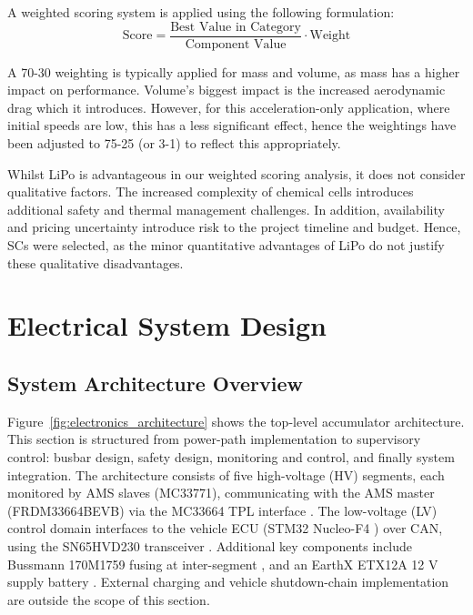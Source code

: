 A weighted scoring system is applied using the following formulation:
\begin{equation*}
\text{Score} = \frac{\text{Best Value in Category}}{\text{Component Value}} \cdot \text{Weight}
\end{equation*}

A 70-30 weighting is typically applied for mass and volume, as mass has a higher impact on performance. Volume's biggest impact is the increased aerodynamic drag which it introduces. However, for this acceleration-only application, where initial speeds are low, this has a less significant effect, hence the weightings have been adjusted to 75-25 (or 3-1) to reflect this appropriately.

Whilst LiPo is advantageous in our weighted scoring analysis, it does not consider qualitative factors. The increased complexity of chemical cells introduces additional safety and thermal management challenges. In addition, availability and pricing uncertainty introduce risk to the project timeline and budget. Hence, SCs were selected, as the minor quantitative advantages of LiPo do not justify these qualitative disadvantages.

\section{Electrical System Design}

\subsection{System Architecture Overview}

Figure~\ref{fig:electronics_architecture} shows the top-level accumulator architecture. This section is structured from power-path implementation to supervisory control: busbar design, safety design, monitoring and control, and finally system integration. The architecture consists of five high-voltage (HV) segments, each monitored by AMS slaves (MC33771), communicating with the AMS master (FRDM33664BEVB) via the MC33664 TPL interface \cite{nxp-mc33771-ds}. The low-voltage (LV) control domain interfaces to the vehicle ECU (STM32 Nucleo-F4 \cite{stm32-nucleo-f4}) over CAN, using the SN65HVD230 transceiver \cite{ti-sn65hvd230-ds}. Additional key components include Bussmann 170M1759 fusing at inter-segment \cite{eaton-bussmann-170m1759-ds}, and an EarthX ETX12A 12 V supply battery \cite{earthx-etx12a-ds}. External charging and vehicle shutdown-chain implementation are outside the scope of this section.

